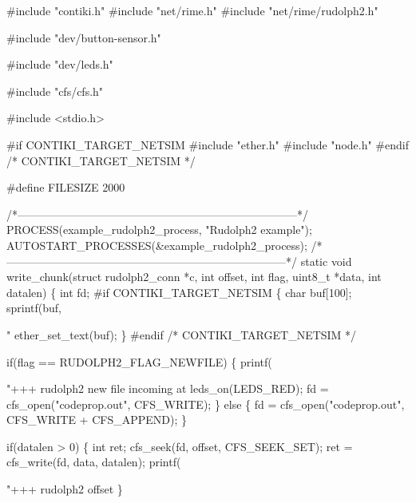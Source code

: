 \begin{DoxyCodeInclude}
\textcolor{preprocessor}{#include "contiki.h"}
\textcolor{preprocessor}{#include "net/rime.h"}
\textcolor{preprocessor}{#include "net/rime/rudolph2.h"}

\textcolor{preprocessor}{#include "dev/button-sensor.h"}

\textcolor{preprocessor}{#include "dev/leds.h"}

\textcolor{preprocessor}{#include "cfs/cfs.h"}

\textcolor{preprocessor}{#include <stdio.h>}

\textcolor{preprocessor}{#if CONTIKI\_TARGET\_NETSIM}
\textcolor{preprocessor}{#include "ether.h"}
\textcolor{preprocessor}{#include "node.h"}
\textcolor{preprocessor}{#endif }\textcolor{comment}{/* CONTIKI\_TARGET\_NETSIM */}\textcolor{preprocessor}{}

\textcolor{preprocessor}{#define FILESIZE 2000}

\textcolor{comment}{/*---------------------------------------------------------------------------*/}
PROCESS(example\_rudolph2\_process, \textcolor{stringliteral}{"Rudolph2 example"});
AUTOSTART\_PROCESSES(&example\_rudolph2\_process);
\textcolor{comment}{/*---------------------------------------------------------------------------*/}
\textcolor{keyword}{static} \textcolor{keywordtype}{void}
write\_chunk(\textcolor{keyword}{struct} rudolph2\_conn *c, \textcolor{keywordtype}{int} offset, \textcolor{keywordtype}{int} flag,
            uint8\_t *data, \textcolor{keywordtype}{int} datalen)
\{
  \textcolor{keywordtype}{int} fd;
\textcolor{preprocessor}{#if CONTIKI\_TARGET\_NETSIM}
  \{
    \textcolor{keywordtype}{char} buf[100];
    sprintf(buf, \textcolor{stringliteral}{"%
    ether\_set\_text(buf);
  \}
\textcolor{preprocessor}{#endif }\textcolor{comment}{/* CONTIKI\_TARGET\_NETSIM */}\textcolor{preprocessor}{}

  \textcolor{keywordflow}{if}(flag == RUDOLPH2\_FLAG\_NEWFILE) \{
    printf(\textcolor{stringliteral}{"+++ rudolph2 new file incoming at %
    leds\_on(LEDS\_RED);
    fd = cfs\_open(\textcolor{stringliteral}{"codeprop.out"}, CFS\_WRITE);
  \} \textcolor{keywordflow}{else} \{
    fd = cfs\_open(\textcolor{stringliteral}{"codeprop.out"}, CFS\_WRITE + CFS\_APPEND);
  \}
  
  \textcolor{keywordflow}{if}(datalen > 0) \{
    \textcolor{keywordtype}{int} ret;
    cfs\_seek(fd, offset, CFS\_SEEK\_SET);
    ret = cfs\_write(fd, data, datalen);
    printf(\textcolor{stringliteral}{"+++ rudolph2 offset %
  \}

}}}
\end{DoxyCodeInclude}
